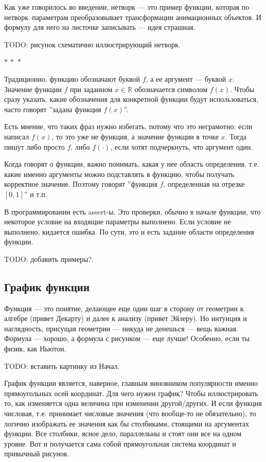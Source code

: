 \documentclass[a4paper,12pt]{article}
\newcommand{\R}{\mathbb{R}}
\newcommand{\threestars}{\begin{center}$ {\ast}\,{\ast}\,{\ast} $\end{center}}
\newcounter{th-counter}
\begin{document}
Как уже говорилось во введении, нетворк --- это пример функции, которая по нетворк--параметрам преобразовывает трансформации анимационных объектов. И формулу для него на листочке записывать --- идея страшная.

TODO: рисунок схематично иллюстрирующий нетворк.

\threestars

Традиционно, функцию обозначают буквой $f$, а ее аргумент --- буквой $x$. Значение функции $f$ при заданном $x \in \R$ обозначается символом $f(x)$. Чтобы сразу указать, какие обозначения для конкретной функции будут использоваться, часто говорят ''задана функция $f(x)$''.

Есть мнение, что таких фраз нужно избегать, потому что это неграмотно: если написал $f(x)$, то это уже не функция, а значение функции в точке $x$. Тогда пишут либо просто $f$, либо $f(\cdot)$, если хотят подчеркнуть, что аргумент один.

Когда говорят о функции, важно понимать, какая у нее область определения, т.е. какие именно аргументы можно подставлять в функцию, чтобы получать корректное значение. Поэтому говорят ''функция $f$, определенная на отрезке $[0,1]$'' и т.п.

В программировании есть assert-ы. Это проверки, обычно в начале функции, что некоторое условие на входящие параметры выполнено. Если условие не выполнено, кидается ошибка. По сути, это и есть задание области определения функции.

TODO: добавить примеры?.

\subsection*{График функции}
Функция --- это понятие, делающее еще один шаг в сторону от геометрии к алгебре (привет Декарту) и далее к анализу (привет Эйлеру). Но интуиция и наглядность, присущая геометрии --- никуда не денешься --- вещь важная. Формула --- хорошо, а формула с рисунком --- еще лучше! Особенно, если ты физик, как Ньютон.

TODO: вставить картинку из Начал.

График функции является, наверное, главным виновником популярности именно прямоугольных осей координат. Для чего нужен график? Чтобы иллюстрировать то, как изменяется одна величина при изменении другой/других. И если функция числовая, т.е. принимает числовые значения (что вообще-то не обязательно), то логично изображать ее значения как бы столбиками, стоящими на аргументах функции. Все столбики, ясное дело, параллельны и стоят они все на одном уровне. Вот и получается сама собой прямоугольная система координат и привычный рисунок.
\end{document}
